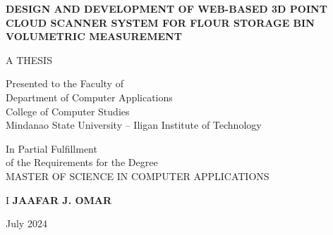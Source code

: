 
\begin{titlepage}
	\setlength{\topmargin}{-40pt}
	\setlength{\textheight}{664pt}
	\begin{singlespace}
		\begin{center}
			\textbf{\MakeUppercase{Design and Development of Web-based 3D Point Cloud Scanner System for Flour Storage Bin Volumetric Measurement}}
			\vspace{3.0cm}

			\MakeUppercase{A THESIS}

			\vspace{3.0cm}

			Presented to the Faculty of\\
			Department of Computer Applications\\
			College of Computer Studies \\
			Mindanao State University -- Iligan Institute of Technology

			\vspace{3.0cm}

			In Partial Fulfillment\\
			of the Requirements for the Degree\\
			MASTER OF SCIENCE IN COMPUTER APPLICATIONS

			\vspace{3.0cm}
I
			\textbf{JAAFAR J. OMAR}

			\vspace{3.0cm}



			July 2024

		\end{center}
	\end{singlespace}
\end{titlepage}